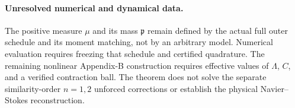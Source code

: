 \paragraph{Unresolved numerical and dynamical data.}
The positive measure $\mu$ and its mass $\mathfrak p$ remain
defined by the actual full outer schedule and its moment matching,
not by an arbitrary model. Numerical evaluation requires freezing
that schedule and certified quadrature. The remaining nonlinear
Appendix-B construction requires effective values of $\Lambda$,
$C$, and a verified contraction ball. The theorem does not solve
the separate similarity-order $n=1,2$ unforced corrections or
establish the physical Navier--Stokes reconstruction.
